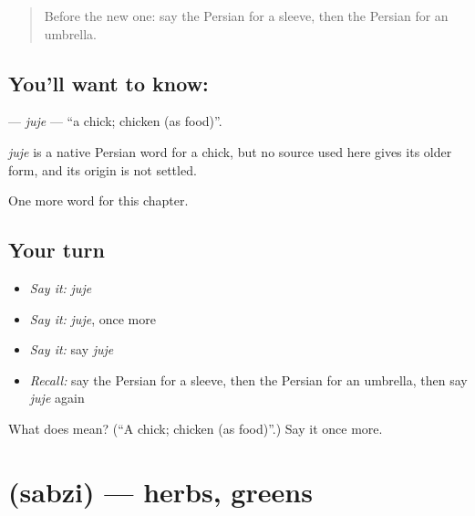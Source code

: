 \label{lesson:FA-C240-juje}



\begin{quote}
Before the new one: say the Persian for a sleeve, then the Persian for an umbrella.
\end{quote}

\subsection*{You'll want to know: }
\textbf{} — \emph{juje} — \textquotedblleft{}a chick; chicken (as food)\textquotedblright{}.

\begin{cousinweb}
\emph{juje} is a native Persian word for a chick, but no source used here gives its older form, and its origin is not settled.
\end{cousinweb}

\begin{grammarlens}[title={What you've built}]
One more word for this chapter.
\end{grammarlens}

\subsection*{Your turn}
\begin{itemize}
\raggedright
  \item \emph{Say it:} \emph{juje}
  \item \emph{Say it:} \emph{juje}, once more
  \item \emph{Say it:} say \emph{juje}
  \item \emph{Recall:} say the Persian for a sleeve, then the Persian for an umbrella, then say \emph{juje} again
\end{itemize}

\begin{tcolorbox}[breakable,colback=teal!4,colframe=teal!35!black,title={Before you move on}]
What does  mean? (\textquotedblleft{}A chick; chicken (as food)\textquotedblright{}.) Say it once more.
\end{tcolorbox}
\section[\texorpdfstring{\fa{سبزی} (sabzi)}{سبزی (sabzi)}]{ (sabzi) — herbs, greens}

\label{lesson:FA-C240-sabzi}




